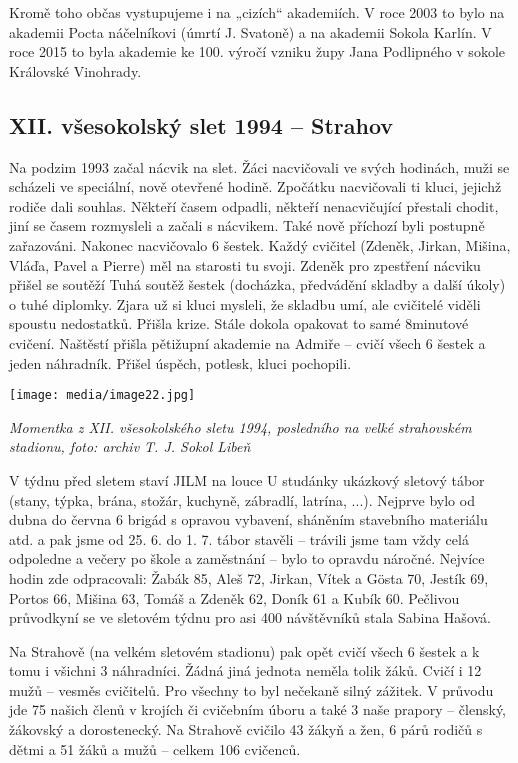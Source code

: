 Kromě toho občas vystupujeme i na „cizích`` akademiích. V roce 2003 to
bylo na akademii Pocta náčelníkovi (úmrtí J. Svatoně) a na akademii
Sokola Karlín. V roce 2015 to byla akademie ke 100. výročí vzniku župy
Jana Podlipného v sokole Královské Vinohrady.

\subsection{XII. všesokolský slet 1994 --
Strahov}\label{xii.-vux161esokolskuxfd-slet-1994-strahov}

Na podzim 1993 začal nácvik na slet. Žáci nacvičovali ve svých hodinách,
muži se scházeli ve speciální, nově otevřené hodině. Zpočátku
nacvičovali ti kluci, jejichž rodiče dali souhlas. Někteří časem
odpadli, někteří nenacvičující přestali chodit, jiní se časem rozmysleli
a začali s nácvikem. Také nově příchozí byli postupně zařazováni.
Nakonec nacvičovalo 6 šestek. Každý cvičitel (Zdeněk, Jirkan, Mišina,
Vláďa, Pavel a Pierre) měl na starosti tu svoji. Zdeněk pro zpestření
nácviku přišel se soutěží Tuhá soutěž šestek (docházka, předvádění
skladby a další úkoly) o tuhé diplomky. Zjara už si kluci mysleli, že
skladbu umí, ale cvičitelé viděli spoustu nedostatků. Přišla krize.
Stále dokola opakovat to samé 8minutové cvičení. Naštěstí přišla
pětižupní akademie na Admiře -- cvičí všech 6 šestek a jeden náhradník.
Přišel úspěch, potlesk, kluci pochopili.

\texttt{[image: media/image22.jpg]}

\emph{Momentka z XII. všesokolského sletu 1994, posledního na velké
strahovském stadionu, foto: archiv T. J. Sokol Libeň}

V týdnu před sletem staví JILM na louce U studánky ukázkový sletový
tábor (stany, týpka, brána, stožár, kuchyně, zábradlí, latrína, ...).
Nejprve bylo od dubna do června 6 brigád s opravou vybavení, sháněním
stavebního materiálu atd. a pak jsme od 25. 6. do 1. 7. tábor stavěli --
trávili jsme tam vždy celá odpoledne a večery po škole a zaměstnání --
bylo to opravdu náročné. Nejvíce hodin zde odpracovali: Žabák 85, Aleš
72, Jirkan, Vítek a Gösta 70, Jestík 69, Portos 66, Mišina 63, Tomáš a
Zdeněk 62, Doník 61 a Kubík 60. Pečlivou průvodkyní se ve sletovém týdnu
pro asi 400 návštěvníků stala Sabina Hašová.

Na Strahově (na velkém sletovém stadionu) pak opět cvičí všech 6 šestek
a k tomu i všichni 3 náhradníci. Žádná jiná jednota neměla tolik žáků.
Cvičí i 12 mužů -- vesměs cvičitelů. Pro všechny to byl nečekaně silný
zážitek. V průvodu jde 75 našich členů v krojích či cvičebním úboru a
také 3 naše prapory -- členský, žákovský a dorostenecký. Na Strahově
cvičilo 43 žákyň a žen, 6 párů rodičů s dětmi a 51 žáků a mužů -- celkem
106 cvičenců.

